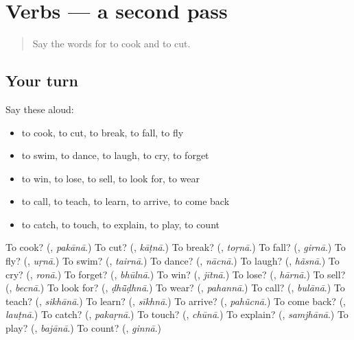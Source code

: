\section[(dialogue)]{Verbs — a second pass}

\label{lesson:HI-R165-second-pass-verbs}



\begin{quote}
Say the words for to cook and to cut.
\end{quote}

\subsection*{Your turn}
Say these aloud:

\begin{itemize}
\raggedright
  \item to cook, to cut, to break, to fall, to fly
  \item to swim, to dance, to laugh, to cry, to forget
  \item to win, to lose, to sell, to look for, to wear
  \item to call, to teach, to learn, to arrive, to come back
  \item to catch, to touch, to explain, to play, to count
\end{itemize}

\begin{tcolorbox}[breakable,colback=teal!4,colframe=teal!35!black,title={Before you move on}]
To cook? (\textbf{}, \emph{pakānā}.) To cut? (\textbf{}, \emph{kāṭnā}.) To break? (\textbf{}, \emph{toṛnā}.) To fall? (\textbf{}, \emph{girnā}.) To fly? (\textbf{}, \emph{uṛnā}.) To swim? (\textbf{}, \emph{tairnā}.) To dance? (\textbf{}, \emph{nācnā}.) To laugh? (\textbf{}, \emph{hãsnā}.) To cry? (\textbf{}, \emph{ronā}.) To forget? (\textbf{}, \emph{bhūlnā}.) To win? (\textbf{}, \emph{jītnā}.) To lose? (\textbf{}, \emph{hārnā}.) To sell? (\textbf{}, \emph{becnā}.) To look for? (\textbf{}, \emph{ḍhū̃ḍhnā}.) To wear? (\textbf{}, \emph{pahannā}.) To call? (\textbf{}, \emph{bulānā}.) To teach? (\textbf{}, \emph{sikhānā}.) To learn? (\textbf{}, \emph{sīkhnā}.) To arrive? (\textbf{}, \emph{pahũcnā}.) To come back? (\textbf{}, \emph{lauṭnā}.) To catch? (\textbf{}, \emph{pakaṛnā}.) To touch? (\textbf{}, \emph{chūnā}.) To explain? (\textbf{}, \emph{samjhānā}.) To play? (\textbf{}, \emph{bajānā}.) To count? (\textbf{}, \emph{ginnā}.)
\end{tcolorbox}
